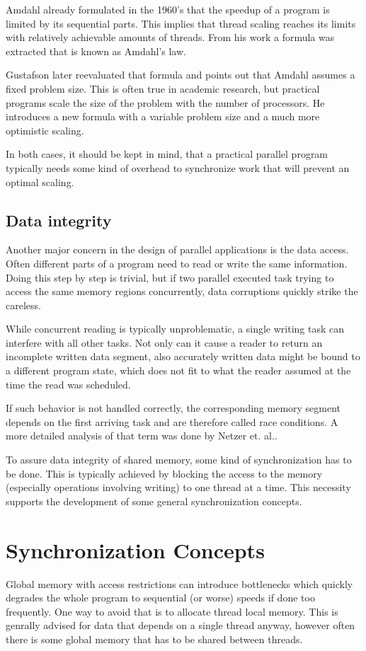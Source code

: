 Amdahl already formulated in the 1960's\cite{amdahl1967validity} that the speedup of a program is limited by its sequential parts. This implies that thread scaling reaches its limits with relatively achievable amounts of threads. From his work a formula was extracted that is known as Amdahl's law. 

Gustafson later reevaluated that formula\cite{gustafson1988reevaluating} and points out that Amdahl assumes a fixed problem size. This is often true in academic research, but practical programs scale the size of the problem with the number of processors. He introduces a new formula with a variable problem size and a much more optimistic scaling.

In both cases, it should be kept in mind, that a practical parallel program typically needs some kind of overhead to synchronize work that will prevent an optimal scaling. 

\subsection{Data integrity}
Another major concern in the design of parallel applications is the data access. Often different parts of a program need to read or write the same information. Doing this step by step is trivial, but if two parallel executed task trying to access the same memory regions concurrently, data corruptions quickly strike the careless.

While concurrent reading is typically unproblematic, a single writing task can interfere with all other tasks. Not only can it cause a reader to return an incomplete written data segment, also accurately written data might be bound to a different program state, which does not fit to what the reader assumed at the time the read was scheduled.

If such behavior is not handled correctly, the corresponding memory segment depends on the first arriving task and are therefore called race conditions. A more detailed analysis of that term was done by Netzer et. al.\cite{netzer1992race}.

To assure data integrity of shared memory, some kind of synchronization has to be done. This is typically achieved by blocking the access to the memory (especially operations involving writing) to one thread at a time. This necessity supports the development of some general synchronization concepts.

\section{Synchronization Concepts}
Global memory with access restrictions can introduce bottlenecks which quickly degrades the whole program to sequential (or worse) speeds if done too frequently. One way to avoid that is to allocate thread local memory. This is genrally advised for data that depends on a single thread anyway, however often there is some global memory that has to be shared between threads.


